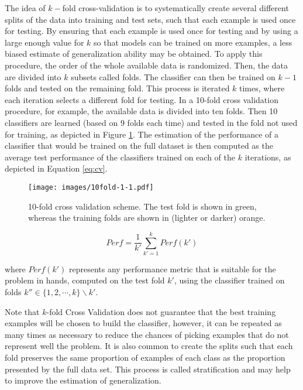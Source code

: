 The idea of $k-$fold cross-validation is to systematically create several different splits of the data into training and test sets, such that each example is used once for testing. By ensuring that each example is used once for testing and by using a large enough value for $k$ so that models can be trained on more examples, a less biased estimate of generalization ability may be obtained. To apply this procedure, the order of the whole available data is randomized. Then, the data are divided into $k$ subsets called folds. The classifier can then be trained on $k-1$ folds and tested on the remaining fold. This process is iterated $k$ times, where each iteration selects a different fold for testing. In a 10-fold cross validation procedure, for example, the available data is divided into ten folds. Then 10 classifiers are learned (based on 9 folds each time) and tested in the fold not used for training, as depicted in Figure \ref{fig:10fold}. The estimation of the performance of a classifier that would be trained on the full dataset is then computed as the average test performance of the classifiers trained on each of the $k$ iterations, as depicted in Equation \ref{eq:cv}. 

\begin{figure}[h]
    \centering
    \texttt{[image: images/10fold-1-1.pdf]}
    \caption{10-fold cross validation scheme. The test fold is shown in green, whereas the training folds are shown in (lighter or darker) orange.}
    \label{fig:10fold}
\end{figure}

\begin{equation}
    Perf = \frac{1}{k'}\sum_{k' = 1}^{k} Perf(k')
    \label{eq:cv}
\end{equation}

\noindent where $Perf(k')$ represents any performance metric that is suitable for the problem in hands, computed on the test fold $k'$, using the classifier trained on folds $k'' \in \{1,2,\cdots,k\} \backslash k'$.






Note that $k$-fold Cross Validation does not guarantee that the best training examples will be chosen to build the classifier, however, it can be repeated as many times as necessary to reduce the chances of picking examples that do not represent well the problem.  It is also common to create the splits such that each fold preserves the same proportion of examples of each class as the proportion presented by the full data set. This process is called stratification and may help to improve the estimation of generalization.   

